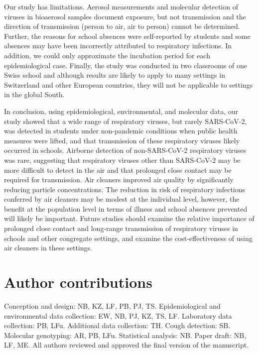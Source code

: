 \documentclass[fleqn,11pt]{wlscirep}
\begin{document}

Our study has limitations. Aerosol measurements and molecular detection of viruses in bioaerosol samples document exposure, but not transmission and the direction of transmission (person to air, air to person) cannot be determined. Further, the reasons for school absences were self-reported by students and some absences may have been incorrectly attributed to respiratory infections. In addition, we could only approximate the incubation period for each epidemiological case. Finally, the study was conducted in two classrooms of one Swiss school and although results are likely to apply to many settings in Switzerland and other European countries, they will not be applicable to settings in the global South. 


In conclusion, using epidemiological, environmental, and molecular data, our study showed that a wide range of respiratory viruses, but rarely SARS-CoV-2, was detected in students under non-pandemic conditions when public health measures were lifted, and that transmission of these respiratory viruses likely occurred in schools. Airborne detection of non-SARS-CoV-2 respiratory viruses was rare, suggesting that respiratory viruses other than SARS-CoV-2 may be more difficult to detect in the air and that prolonged close contact may be required for transmission. Air cleaners improved air quality by significantly reducing particle concentrations. The reduction in risk of respiratory infections conferred by air cleaners may be modest at the individual level, however, the benefit at the population level in terms of illness and school absences prevented will likely be important. Future studies should examine the relative importance of prolonged close contact and long-range transmission of respiratory viruses in schools and other congregate settings, and examine the cost-effectiveness of using air cleaners in these settings.

\newpage


\section*{Author contributions}
Conception and design: NB, KZ, LF, PB, PJ, TS. Epidemiological and environmental data collection: EW, NB, PJ, KZ, TS, LF. Laboratory data collection: PB, LFu. Additional data collection: TH. Cough detection: SB. Molecular genotyping: AR, PB, LFu. Statistical analysis: NB. Paper draft: NB, LF, ME. All authors reviewed and approved the final version of the manuscript.
\end{document}
